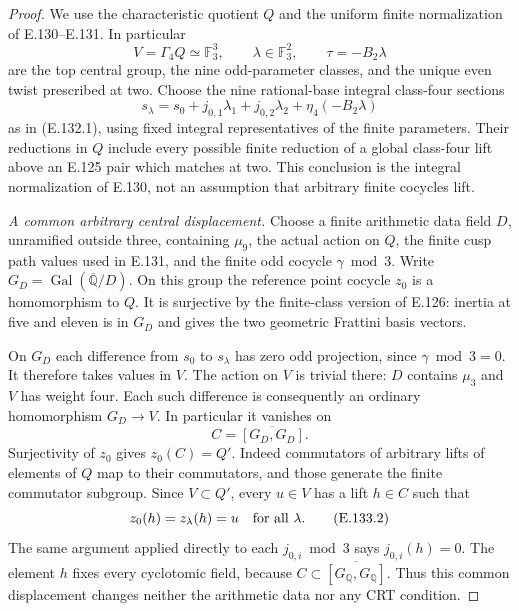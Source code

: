 \begin{proof}
We use the characteristic quotient $Q$ and the uniform
finite normalization of E.130--E.131. In particular
\[
 V=\Gamma_4Q\simeq\mathbb F_3^3,
 \qquad \lambda\in\mathbb F_3^2,
 \qquad \tau=-B_2\lambda
 \tag{E.133.1}
\]
are the top central group, the nine odd-parameter
classes, and the unique even twist prescribed at two.
Choose the nine rational-base integral class-four
sections
\[
 s_\lambda=s_0+j_{0,1}\lambda_1+j_{0,2}\lambda_2
                   +\eta_4(-B_2\lambda)
\]
as in (E.132.1), using fixed integral representatives
of the finite parameters. Their reductions in $Q$
include every possible finite reduction of a global
class-four lift above an E.125 pair which matches at
two. This conclusion is the integral normalization
of E.130, not an assumption that arbitrary finite
cocycles lift.

\emph{A common arbitrary central displacement.}
Choose a finite arithmetic data field $D$, unramified
outside three, containing $\mu_9$, the actual action
on $Q$, the finite cusp path values used in E.131,
and the finite odd cocycle $\gamma\bmod3$.
Write $G_D=\operatorname{Gal}(\overline{\mathbb Q}/D)$.
On this group the reference point cocycle $z_0$
is a homomorphism to $Q$. It is surjective by the
finite-class version of E.126: inertia at five and
eleven is in $G_D$ and gives the two geometric
Frattini basis vectors.

On $G_D$ each difference from $s_0$ to $s_\lambda$
has zero odd projection, since $\gamma\bmod3=0$.
It therefore takes values in $V$. The action on $V$
is trivial there: $D$ contains $\mu_3$ and $V$ has
weight four. Each such difference is consequently
an ordinary homomorphism $G_D\to V$.
In particular it vanishes on
\[
                         C=\overline{[G_D,G_D]}.
\]
Surjectivity of $z_0$ gives $z_0(C)=Q'$.
Indeed commutators of arbitrary lifts of elements
of $Q$ map to their commutators, and those generate
the finite commutator subgroup. Since $V\subset Q'$,
every $u\in V$ has a lift $h\in C$ such that
\[
                z_0(h)=z_\lambda(h)=u
                         \quad\hbox{for all }\lambda.
 \tag{E.133.2}
\]
The same argument applied directly to each
$j_{0,i}\bmod3$ says $j_{0,i}(h)=0$.
The element $h$ fixes every cyclotomic field,
because $C\subset\overline{[G_{\mathbb Q},G_{\mathbb Q}]}$.
Thus this common displacement changes neither
the arithmetic data nor any CRT condition.


\end{proof}
